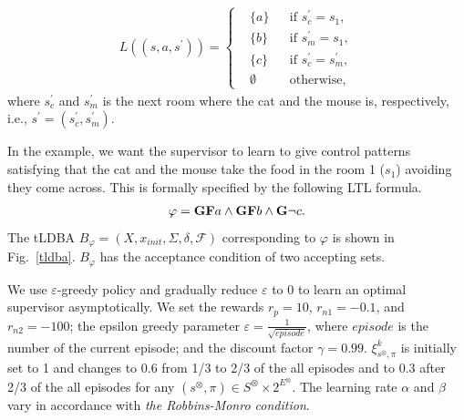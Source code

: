 \documentclass[letterpaper, 10 pt, conference]{ieeeconf}
\begin{document}
\begin{align}
   L((s, a, s^{\prime})) =
    \left\{
    \begin{aligned}
      & \{ a \} &  & \text{if }s_c^{\prime} = s_1, \nonumber \\
      & \{ b \} &  & \text{if }s_m^{\prime} = s_1, \nonumber \\
      & \{ c \} &  & \text{if }s_c^{\prime} = s_m^{\prime}, \nonumber \\
      & \emptyset &  & \text{otherwise},
    \end{aligned}
    \right.
\end{align}
where $s_c^{\prime}$ and $s_m^{\prime}$ is the next room where the cat and the mouse is, respectively, i.e., $s^{\prime} = (s_c^{\prime},s_m^{\prime})$.

In the example, we want the supervisor to learn to give control patterns satisfying that the cat and the mouse take the food in the room 1 ($s_1$) avoiding they come across. This is formally specified by the following LTL formula.
\begin{align*}
  \varphi = \text{{\bf GF}}a \wedge \text{{\bf GF}}b \wedge \text{{\bf G}}\neg c.
\end{align*}
The tLDBA $B_{\varphi} = (X, x_{init},\Sigma,\delta,\mathcal{F})$ corresponding to $\varphi$ is shown in Fig.\ \ref{tldba}. $B_{\varphi}$ has the acceptance condition of two accepting sets.

We use $\varepsilon$-greedy policy and gradually reduce $\varepsilon$ to 0 to learn an optimal supervisor asymptotically.
We set the rewards $r_p = 10$, $r_{n1} = -0.1$, and $r_{n2} = -100$; the epsilon greedy parameter $ \varepsilon = \frac{1}{ \sqrt{episode} }$, where $episode$ is the number of the current episode; and the discount factor $\gamma = 0.99$. $\xi^k_{s^{\otimes},\pi}$ is initially set to 1 and changes to 0.6 from 1/3 to 2/3 of the all episodes and to 0.3 after 2/3 of the all episodes for any $(s^{\otimes},\pi) \in S^{\otimes} \times 2^{E^{\otimes}}$. The learning rate $\alpha$ and $\beta$ vary in accordance with {\it the Robbins-Monro condition}.
\end{document}
